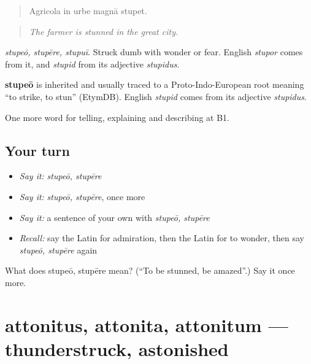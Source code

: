 \begin{quote}
Agricola in urbe magnā stupet.
\end{quote}

\begin{quote}
\emph{The farmer is stunned in the great city.}
\end{quote}

\emph{stupeō, stupēre, stupuī}. Struck dumb with wonder or fear. English \emph{stupor} comes from it, and \emph{stupid} from its adjective \emph{stupidus}.

\begin{cousinweb}
\textbf{stupeō} is inherited and usually traced to a Proto-Indo-European root meaning \textquotedblleft{}to strike, to stun\textquotedblright{} (EtymDB). English \emph{stupid} comes from its adjective \emph{stupidus}.
\end{cousinweb}

\begin{grammarlens}[title={What you've built}]
One more word for telling, explaining and describing at B1.
\end{grammarlens}

\subsection*{Your turn}
\begin{itemize}
\raggedright
  \item \emph{Say it:} \emph{stupeō, stupēre}
  \item \emph{Say it:} \emph{stupeō, stupēre}, once more
  \item \emph{Say it:} a sentence of your own with \emph{stupeō, stupēre}
  \item \emph{Recall:} say the Latin for admiration, then the Latin for to wonder, then say \emph{stupeō, stupēre} again
\end{itemize}

\begin{tcolorbox}[breakable,colback=teal!4,colframe=teal!35!black,title={Before you move on}]
What does stupeō, stupēre mean? (\textquotedblleft{}To be stunned, be amazed\textquotedblright{}.) Say it once more.
\end{tcolorbox}
\section[attonitus, attonita, attonitum]{attonitus, attonita, attonitum — thunderstruck, astonished}

